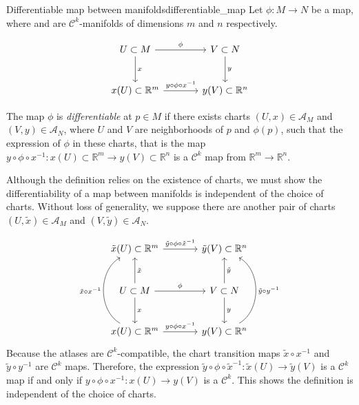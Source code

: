 \begin{definition}{Differentiable map between manifolds}{differentiable_map}
    Let \(\phi : M \to N\) be a map, where  and  are \(\mathcal{C}^k\)-manifolds of dimensions \(m\) and \(n\) respectively.

    \begin{equation*}
        \begin{tikzcd}[column sep = large, row sep = large]
            U \subset M \arrow{d}{x}  \arrow{r}{\phi} & V \subset N \arrow{d}{y} \\
            x(U) \subset \mathbb{R}^m \arrow{r}{y\circ \phi \circ x^{-1}} & y(V) \subset \mathbb{R}^n
        \end{tikzcd}
    \end{equation*}

    The map \(\phi\) is \emph{differentiable} at \(p \in M\) if there exists charts \((U, x) \in \mathscr{A}_M\) and \((V, y) \in \mathscr{A}_N\), where \(U\) and \(V\) are neighborhoods of \(p\) and \(\phi(p)\), such that the expression of \(\phi\) in these charts, that is the map \(y \circ \phi \circ x^{-1} : x(U) \subset \mathbb{R}^m \to y(V) \subset \mathbb{R}^n\) is a \(\mathcal{C}^k\) map from \(\mathbb{R}^m\to \mathbb{R}^n\).
\end{definition}

Although the definition relies on the existence of charts, we must show the differentiability of a map between manifolds is independent of the choice of charts. Without loss of generality, we suppose there are another pair of charts \((U, \tilde{x})\in\mathscr{A}_M\) and \((V, \tilde{y})\in\mathscr{A}_N\).

\begin{equation*}
    \begin{tikzcd}[column sep = large, row sep = large]
        \tilde{x}(U) \subset \mathbb{R}^m \arrow{r}{\tilde{y}\circ \phi \circ \tilde{x}^{-1}} & \tilde{y}(V) \subset \mathbb{R}^n\\
        U \subset M \arrow{d}{x} \arrow[swap]{u}{\tilde{x}} \arrow{r}{\phi} & V \subset N \arrow{d}{y} \arrow[swap]{u}{\tilde{y}}\\
        x(U) \subset \mathbb{R}^m \arrow{r}{y\circ \phi \circ x^{-1}} \arrow[bend left=60]{uu}{\tilde{x} \circ x^{-1}} & y(V) \subset \mathbb{R}^n \arrow[bend right=60, swap]{uu}{\tilde{y}\circ y^{-1}}
    \end{tikzcd}
\end{equation*}
Because the atlases are \(\mathcal{C}^k\)-compatible, the chart transition maps \(\tilde{x}\circ x^{-1}\) and \(\tilde{y} \circ y^{-1}\) are \(\mathcal{C}^k\) maps. Therefore, the expression \(\tilde{y}\circ \phi \circ\tilde{x}^{-1} : \tilde{x}(U) \to \tilde{y}(V)\) is a \(\mathcal{C}^k\) map if and only if \(y\circ \phi\circ x^{-1} : x(U) \to y(V)\) is a \(\mathcal{C}^k\). This shows the definition is independent of the choice of charts.

